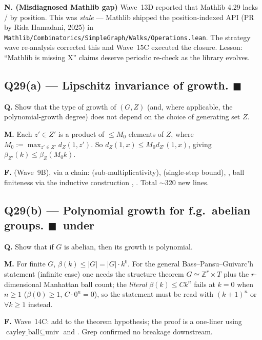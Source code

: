 \documentclass[11pt,a4paper]{article}
\newcommand{\done}[1]{\textcolor{donegreen}{\textbf{#1}}}
\newcommand{\cmd}[1]{\texttt{\small #1}}
\newcommand{\Z}{\mathbb{Z}}
\theoremstyle{plain}
\theoremstyle{definition}
\begin{document}
\textbf{N. (Misdiagnosed Mathlib gap)} Wave~13D reported that
Mathlib 4.29 lacks / by position.
This was \emph{stale} --- Mathlib shipped the position-indexed
API (PR by Rida Hamadani, 2025) in
\cmd{Mathlib/Combinatorics/SimpleGraph/Walks/Operations.lean}.
The strategy wave re-analysis corrected this and Wave~15C
executed the closure. Lesson: ``Mathlib is missing X'' claims
deserve periodic re-check as the library evolves.

\subsection{Q29(a) --- Lipschitz invariance of growth. \done{$\blacksquare$}}

\textbf{Q.} Show that the type of growth of $(G, Z)$ (and, where
applicable, the polynomial-growth degree) does not depend on the
choice of generating set $Z$.

\textbf{M.} Each $z' \in Z'$ is a product of $\leq M_0$ elements of
$Z$, where $M_0 := \max_{z' \in Z'} d_Z(1, z')$. So
$d_Z(1, x) \leq M_0 d_{Z'}(1, x)$, giving
$\beta_{Z'}(k) \leq \beta_Z(M_0 k)$.

\textbf{F.}  (Wave~9B), via a
chain:  (sub-multiplicativity),
 (single-step bound),
, ball finiteness via the
inductive construction ,
. Total $\sim$320
new lines.

\subsection{Q29(b) --- Polynomial growth for f.g.\ abelian groups. \done{$\blacksquare$}{\normalfont\ under \lean{[Finite G]}}}

\textbf{Q.} Show that if $G$ is abelian, then its growth is
polynomial.

\textbf{M.} For finite $G$, $\beta(k) \leq |G| = |G| \cdot k^0$.
For the general Bass--Pansu--Guivarc'h statement (infinite case)
one needs the structure theorem $G \simeq \Z^r \times T$ plus
the $r$-dimensional Manhattan ball count; the \emph{literal}
$\beta(k) \leq C k^n$ fails at $k = 0$ when $n \geq 1$ ($\beta(0)
\geq 1$, $C \cdot 0^n = 0$), so the statement must be read with
$(k+1)^n$ or $\forall k \geq 1$ instead.

\textbf{F.} Wave~14C: add \lean{[Finite G]} to the theorem
hypothesis; the proof is a one-liner using
$\text{cayley\_ball} \subseteq \text{univ}$ and
. Grep confirmed no breakage downstream.
\end{document}
